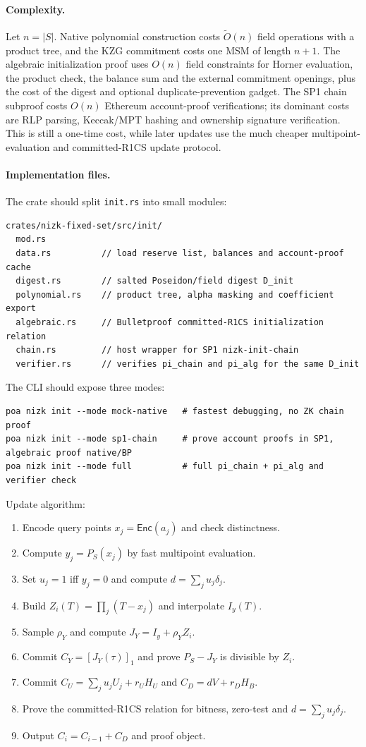 \documentclass[UTF8,a4paper,11pt]{ctexart}
\newcommand{\Enc}{\mathsf{Enc}}
\begin{document}
\paragraph{Complexity.}
Let $n=|S|$.  Native polynomial construction costs $\widetilde O(n)$ field operations with a product
tree, and the KZG commitment costs one MSM of length $n+1$.  The algebraic initialization proof uses
$O(n)$ field constraints for Horner evaluation, the product check, the balance sum and the external
commitment openings, plus the cost of the digest and optional duplicate-prevention gadget.  The SP1
chain subproof costs $O(n)$ Ethereum account-proof verifications; its dominant costs are RLP parsing,
Keccak/MPT hashing and ownership signature verification.  This is still a one-time cost, while later
updates use the much cheaper multipoint-evaluation and committed-R1CS update protocol.

\paragraph{Implementation files.}
The crate should split \texttt{init.rs} into small modules:
\begin{lstlisting}
crates/nizk-fixed-set/src/init/
  mod.rs
  data.rs          // load reserve list, balances and account-proof cache
  digest.rs        // salted Poseidon/field digest D_init
  polynomial.rs    // product tree, alpha masking and coefficient export
  algebraic.rs     // Bulletproof committed-R1CS initialization relation
  chain.rs         // host wrapper for SP1 nizk-init-chain
  verifier.rs      // verifies pi_chain and pi_alg for the same D_init
\end{lstlisting}
The CLI should expose three modes:
\begin{lstlisting}
poa nizk init --mode mock-native   # fastest debugging, no ZK chain proof
poa nizk init --mode sp1-chain     # prove account proofs in SP1, algebraic proof native/BP
poa nizk init --mode full          # full pi_chain + pi_alg and verifier check
\end{lstlisting}


Update algorithm:
\begin{enumerate}[leftmargin=2em]
  \item Encode query points $x_j=\Enc(a_j)$ and check distinctness.
  \item Compute $y_j=P_S(x_j)$ by fast multipoint evaluation.
  \item Set $u_j=1$ iff $y_j=0$ and compute $d=\sum_j u_j\delta_j$.
  \item Build $Z_i(T)=\prod_j(T-x_j)$ and interpolate $I_y(T)$.
  \item Sample $\rho_Y$ and compute $J_Y=I_y+\rho_YZ_i$.
  \item Commit $C_Y=[J_Y(\tau)]_1$ and prove $P_S-J_Y$ is divisible by $Z_i$.
  \item Commit $C_U=\sum_j u_jU_j+r_UH_U$ and $C_D=dV+r_DH_B$.
  \item Prove the committed-R1CS relation for bitness, zero-test and $d=\sum_j u_j\delta_j$.
  \item Output $C_i=C_{i-1}+C_D$ and proof object.
\end{enumerate}
\end{document}
